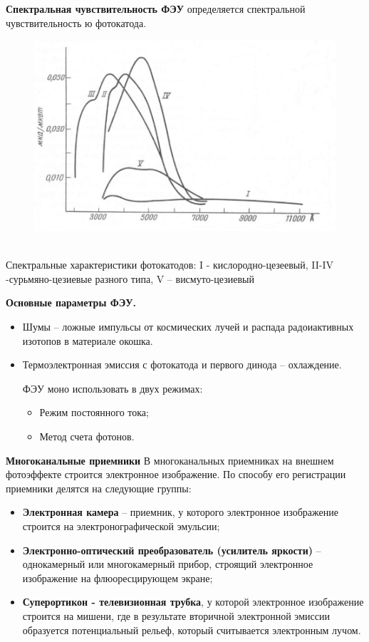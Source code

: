 \documentclass[12pt]{article}
\begin{document}
\textbf{Спектральная
чувствительность
ФЭУ} определяется
спектральной
чувствительность
ю фотокатода.
\begin{figure}[h]
	\centering
	\includegraphics[width=0.7\linewidth]{"Снимок экрана от 2024-12-23 18-55-53"}
\end{figure}\\
Спектральные характеристики фотокатодов: I - кислородно-цезеевый,
II-IV -сурьмяно-цезиевые разного типа, V – висмуто-цезиевый


\textbf{Основные параметры ФЭУ.}
\begin{itemize}
	\item Шумы -- ложные импульсы от космических лучей и распада радоиактивных
	изотопов в материале окошка.
	\item Термоэлектронная эмиссия с фотокатода и первого динода --
	охлаждение.
	
	ФЭУ моно использовать в двух режимах:
	\begin{itemize}
	\item Режим постоянного тока;
	\item Метод счета фотонов.
	\end{itemize}
\end{itemize}


\textbf{Многоканальные приемники}
В многоканальных приемниках на внешнем фотоэффекте строится электронное
изображение.
По способу его регистрации приемники делятся на следующие группы:
\begin{itemize}
	\item \textbf{Электронная камера} -- приемник, у которого электронное изображение строится на
	электронографической эмульсии;
	\item \textbf{Электронно-оптический преобразователь (усилитель яркости)} -- однокамерный или
	многокамерный прибор, строящий электронное изображение на флюоресцирующем
	экране;
	\item \textbf{Суперортикон - телевизионная трубка}, у которой электронное изображение
	строится на мишени, где в результате вторичной электронной эмиссии образуется
	потенциальный рельеф, который считывается электронным лучом.
\end{itemize}
\end{document}
